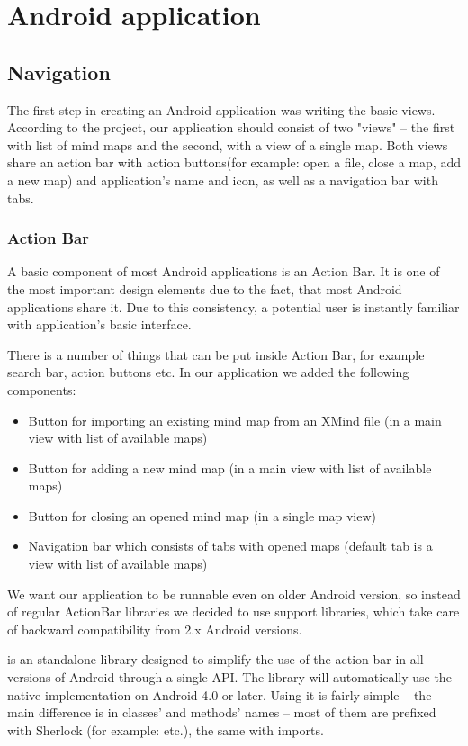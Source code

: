 \section{Android application}
\label{sec:android-app}

\subsection{Navigation}
\label{subsec:drawing}
The first step in creating an Android application was writing the basic views. According to the project, our application should consist of two "views" -- the first with list of mind maps and the second, with a view of a single map. Both views share an action bar with action buttons(for example: open a file, close a map, add a new map) and application's name and icon, as well as a navigation bar with tabs. 

\subsubsection{Action Bar}
\label{subsubsec:action-bar}
A basic component of most Android applications is an Action Bar. It is one of the most important design elements due to the fact, that most Android applications share it. Due to this consistency, a potential user is instantly familiar with application's basic interface. 

There is a number of things that can be put inside Action Bar, for example search bar, action buttons etc. In our application we added the following components:
\begin{itemize}
	\item Button for importing an existing mind map  from an XMind file (in a main view with list of available maps)
	\item Button for adding a new mind map (in a main view with list of available maps)
	\item Button for closing an opened mind map (in a single map view)
	\item Navigation bar which consists of tabs with opened maps (default tab is a view with list of available maps)
\end{itemize}

We want our application to be runnable even on older Android version, so instead of regular ActionBar libraries we decided to use support libraries, which take care of backward compatibility from 2.x Android versions.

 is an standalone library designed to simplify the use of the action bar in all versions of Android through a single API. The library will automatically use the native  implementation on Android 4.0 or later\cite{Wharton:2013:sherlock}. Using it is fairly simple -- the main difference is in  classes' and methods' names -- most of them are prefixed with Sherlock (for example:  etc.), the same with imports. 

